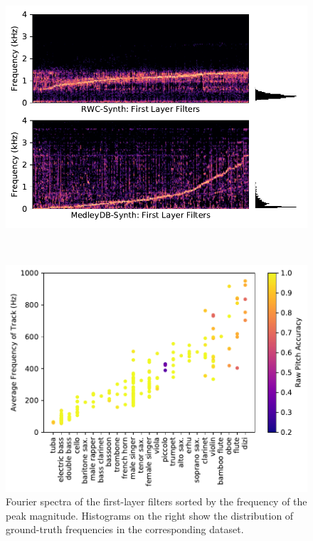 \setlength{\belowcaptionskip}{-8pt}
\captionsetup[figure]{skip=3pt}
\begin{figure}[t]
	\begin{minipage}{0.48\textwidth}
		\begin{center}
			\includegraphics[width=\columnwidth]{firstlayer-45.pdf}
		\end{center}
		\vspace{-10pt}
		\caption{
			Fourier spectra of the first-layer filters sorted by the frequency of the peak magnitude.
			Histograms on the right show the distribution of ground-truth frequencies in the corresponding dataset.
		}
		\label{fig:firstlayer}
	\end{minipage}
	~~~~~~
	\begin{minipage}{0.48\textwidth}
		\begin{center}
			\includegraphics[width=\columnwidth]{per-track-inst-45.pdf}

\end{center}
\end{minipage}
\end{figure}
